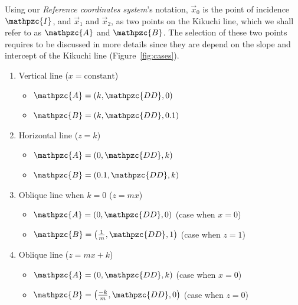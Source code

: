 \documentclass[letterpaper]{article}
\newcommand{\var}[1]{\mathpzc{#1}}
\begin{document}
	Using our \emph{Reference coordinates system}'s notation, $\vec{x}_0$ is the point of incidence $\var{I}$, and $\vec{x}_1$ and $\vec{x}_2$, as two points on the Kikuchi line, which we shall refer to as $\var{A}$ and $\var{B}$.  The selection of these two points requires to be discussed in more details since they are depend on the slope and intercept of the Kikuchi line (Figure~\ref{fig:cases}).
	\begin{enumerate}
		\item Vertical line ($x=\text{constant}$)
			\begin{itemize}
				\item $\var{A} = \left(k, \var{DD}, 0\right)$
				\item $\var{B} = \left(k, \var{DD}, 0.1\right)$
			\end{itemize}
		\item Horizontal line ($z=k$)
			\begin{itemize}
				\item $\var{A} = \left(0, \var{DD}, k\right)$
				\item $\var{B} = \left(0.1, \var{DD}, k\right)$
			\end{itemize}
		\item Oblique line when $k=0$ ($z=mx$)
			\begin{itemize}
				\item $\var{A} = \left(0, \var{DD}, 0\right)$ (case when $x=0$)
				\item $\var{B} = \left(\frac{1}{m}, \var{DD}, 1\right)$ (case when $z=1$)
			\end{itemize}
		\item Oblique line ($z=mx+k$)
			\begin{itemize}
				\item $\var{A} = \left(0, \var{DD}, k\right)$ (case when $x=0$)
				\item $\var{B} = \left(\frac{-k}{m}, \var{DD}, 0\right)$ (case when $z=0$)
			\end{itemize}
	\end{enumerate}
	
\end{document}
